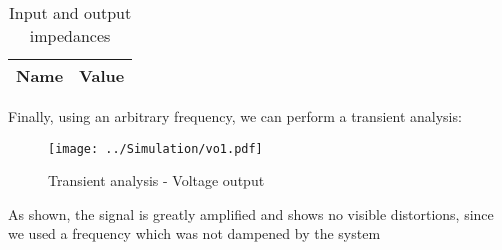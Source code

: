 \begin{table}[H]
  \centering
  \begin{tabular}{|l|r|}
    \hline    
    {\bf Name} & {\bf Value} \\ \hline
    
    
  \end{tabular}
  \caption{Input and output impedances}
  \label{tab: ImpNGS}
\end{table}

Finally, using an arbitrary frequency, we can perform a transient analysis:


\begin{figure}[h!]
    \centering
  \texttt{[image: ../Simulation/vo1.pdf]}
  \caption{Transient analysis - Voltage output}
  \label{tab:TransNGS}
\end{figure}


As shown, the signal is greatly amplified and shows no visible distortions, since we used a frequency which was not dampened by the system
